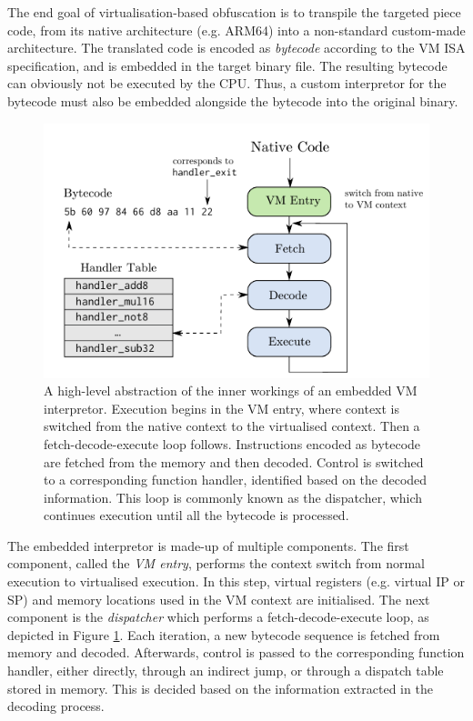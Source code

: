 The end goal of virtualisation-based obfuscation is to transpile the targeted piece code, from its native architecture (e.g. ARM64) into a non-standard custom-made architecture. The translated code is encoded as \emph{bytecode} according to the \gls{VM} \gls{ISA} specification, and is embedded in the target binary file. The resulting bytecode can obviously not be executed by the \gls{CPU}. Thus, a custom interpretor for the bytecode must also be embedded alongside the bytecode into the original binary.

\begin{figure}[ht]
    \centering
    \includegraphics[width=.7\textwidth]{./images/dispatch}
    \caption{A high-level abstraction of the inner workings of an embedded \gls{VM} interpretor. Execution begins in the VM entry, where context is switched from the native context to the virtualised context. Then a fetch-decode-execute loop follows. Instructions encoded as bytecode are fetched from the memory and then decoded. Control is switched to a corresponding function handler, identified based on the decoded information. This loop is commonly known as the dispatcher, which continues execution until all the bytecode is processed. \cite{blazytko2017}}
    \label{fig:dispatch}
\end{figure}

The embedded interpretor is made-up of multiple components. The first component, called the \emph{\gls{VM} entry}, performs the context switch from normal execution to virtualised execution. In this step, virtual registers (e.g. virtual \gls{IP} or \gls{SP}) and memory locations used in the \gls{VM} context are initialised. The next component is the \emph{dispatcher} which performs a fetch-decode-execute loop, as depicted in Figure \ref{fig:dispatch}. Each iteration, a new bytecode sequence is fetched from memory and decoded. Afterwards, control is passed to the corresponding function handler, either directly, through an indirect jump, or through a dispatch table stored in memory. This is decided based on the information extracted in the decoding process. 

